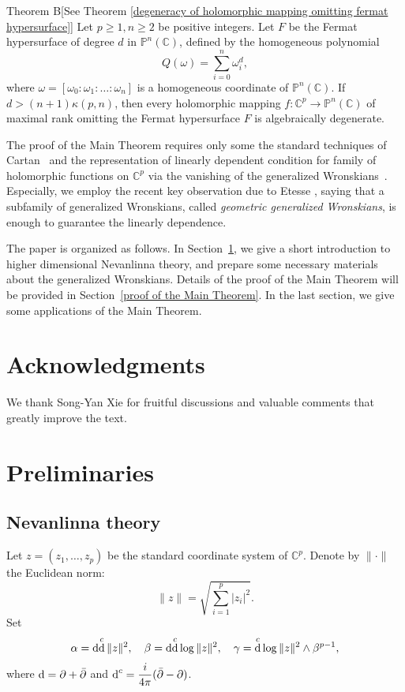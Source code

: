\documentclass[english, 12pt]{amsart}
\DeclareMathOperator{\dif}{\text{\normalfont d}}
\def\log{\mathrm{log}\,}
\theoremstyle{plain}
\theoremstyle{remark}
\numberwithin{equation}{section}
\theoremstyle{plain}
\newcommand{\thistheoremname}{}
\newtheorem*{genericthm*}{\thistheoremname}
\newenvironment{namedthm*}[1]{\renewcommand{\thistheoremname}{#1}%
	\begin{genericthm*}}
	{\end{genericthm*}}
\theoremstyle{named}
\begin{document}
\begin{namedthm*}{Theorem B}[See Theorem \ref{degeneracy of holomorphic mapping omitting fermat hypersurface}]
Let $p\geq 1,n\geq2$ be positive integers. Let $F$ be the Fermat hypersurface of degree $d$ in $\mathbb{P}^n(\mathbb{C})$, defined by the homogeneous polynomial 
$$
Q(\omega)=\sum_{i=0}^n\omega_i^d,
$$
where $\omega=[\omega_0:\omega_1:\dots:\omega_n]$ is a homogeneous coordinate of $\mathbb{P}^n(\mathbb{C})$.
If $d>(n+1)\kappa(p,n)$, then every holomorphic mapping $f\colon\mathbb{C}^p\rightarrow\mathbb{P}^n(\mathbb{C})$ of maximal rank omitting the Fermat hypersurface $F$ is algebraically degenerate.	
\end{namedthm*}

The proof of the Main Theorem requires only some the standard  techniques of Cartan~\cite{Cartan1933} and the representation of linearly dependent condition for family of holomorphic functions on $\mathbb{C}^p$ via the vanishing of the generalized Wronskians~\cite{Schmidt1980,Rot55,Fujimoto1985}. Especially, we employ the recent key observation due to Etesse \cite{Etesse2023}, saying that a subfamily of generalized Wronskians, called {\sl geometric generalized Wronskians}, is enough to guarantee the linearly dependence.

The paper is organized as follows. 
In Section~\ref{section: preparation}, we give a short introduction to higher dimensional Nevanlinna theory, and prepare some necessary materials about the generalized Wronskians. Details of the proof of the Main Theorem will be provided in Section~\ref{proof of the Main Theorem}. In the last section, we give some applications of the Main Theorem. 
	
	

	
	
\section*{Acknowledgments}
We thank Song-Yan Xie for fruitful discussions and valuable comments that greatly improve the text.

\section{Preliminaries}
\label{section: preparation}
	
\subsection{Nevanlinna theory}
Let $z=(z_1,\dots,z_p)$ be the standard coordinate system of $\mathbb{C}^p$. Denote by $\|\cdot\|$ the Euclidean norm:
$$
\|z\|=\sqrt{\sum_{i=1}^{p}|z_i|^2}.
$$	
Set
$$
\alpha=\dif\!\dif^c\|z\|^2,\quad\beta=\dif\!\dif^c\log\|z\|^2,\quad\gamma=\dif^c\log \|z\|^2\wedge\beta^{p-1},
$$
where $\dif=\partial+\bar{\partial}$ and $\dif^c=\dfrac{i}{4\pi}(\bar{\partial}-\partial)$.
\end{document}
